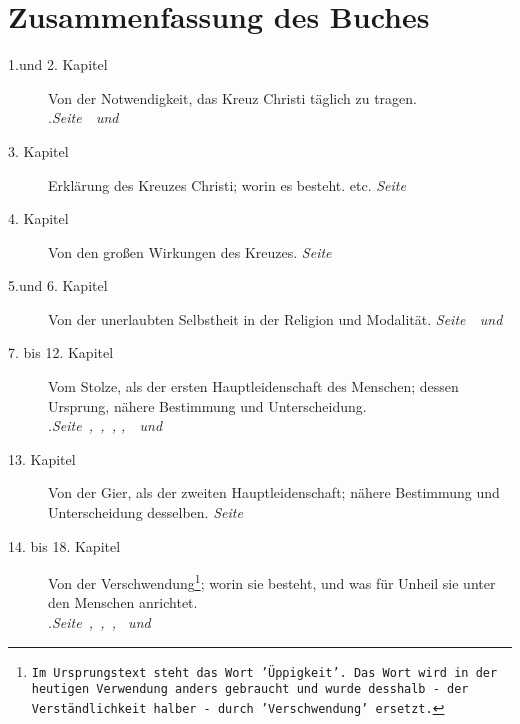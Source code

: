 \documentclass[pdftex,pagesize, 10pt]{scrbook}
\begin{document}
\chapter{Zusammenfassung des Buches}
\begin{description}
\item[1.und 2. Kapitel] Von der Notwendigkeit, das Kreuz Christi täglich zu
tragen.\\
.\dotfill \textit{Seite~\pageref{kap1}~und~\pageref{kap2}}\\
\item[3. Kapitel] Erklärung des Kreuzes Christi; worin es besteht. etc.
\dotfill \textit{Seite~\pageref{kap3}}\\
\item[4. Kapitel] Von den großen Wirkungen des Kreuzes.
\dotfill \textit{Seite~\pageref{kap4}}\\
\item[5.und 6. Kapitel] Von der unerlaubten Selbstheit in der Religion und
Modalität.
\dotfill \textit{Seite~\pageref{kap5}~und~\pageref{kap6}}\\
\item[7. bis 12. Kapitel] Vom Stolze, als der ersten Hauptleidenschaft des
Menschen; dessen Ursprung, nähere Bestimmung und Unterscheidung.\\
.\dotfill \textit{Seite~\pageref{kap7},~\pageref{kap8},~\pageref{kap9}, \pageref{kap10},~\pageref{kap11}~und~\pageref{kap12}}\\
\item[13. Kapitel] Von der Gier, als der zweiten Hauptleidenschaft; nähere
Bestimmung und Unterscheidung desselben.
\dotfill \textit{Seite~\pageref{kap13}}\\
\item[14. bis 18. Kapitel] Von der Verschwendung\footnote{\texttt{Im Ursprungstext steht
das Wort 'Üppigkeit'. Das Wort wird in der heutigen Verwendung anders
gebraucht und wurde desshalb - der Verständlichkeit halber - durch
'Verschwendung' ersetzt.}}; worin sie besteht, und was für Unheil sie unter den
Menschen anrichtet.
\\.\dotfill \textit{Seite~\pageref{kap14},~\pageref{kap15},~\pageref{kap16},
\pageref{kap17}~und~\pageref{kap18}}\\
\end{description}



















\end{document}
